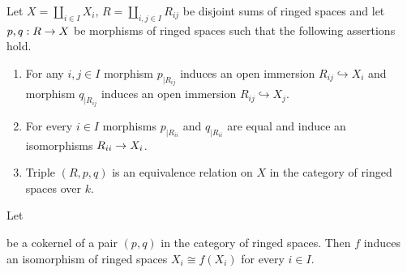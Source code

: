 \begin{theorem}\label{theorem:recollement}
Let $X = \coprod_{i\in I}X_i,\,R = \coprod_{i,j\in I}R_{ij}$ be disjoint sums of ringed spaces and let $p,q:R\rightarrow X$ be morphisms of ringed spaces such that the following assertions hold.
\begin{enumerate}[label=\emph{\textbf{(\arabic*)}}, leftmargin=3.0em]
\item For any $i,j\in I$ morphism $p_{\mid R_{ij}}$ induces an open immersion $R_{ij}\hookrightarrow X_i$ and morphism $q_{\mid R_{ij}}$ induces an open immersion $R_{ij}\hookrightarrow X_j$.
\item For every $i\in I$ morphisms $p_{\mid R_{ii}}$ and $q_{\mid R_{ii}}$ are equal and induce an isomorphisms $R_{ii}\rightarrow X_i$.  
\item Triple $\left(R,p,q\right)$ is an equivalence relation on $X$ in the category of ringed spaces over $k$.
\end{enumerate}
Let 
\begin{center}
\end{center}
be a cokernel of a pair $(p,q)$ in the category of ringed spaces. Then $f$ induces an isomorphism of ringed spaces $X_i \cong f(X_i)$ for every $i\in I$.
\end{theorem}

